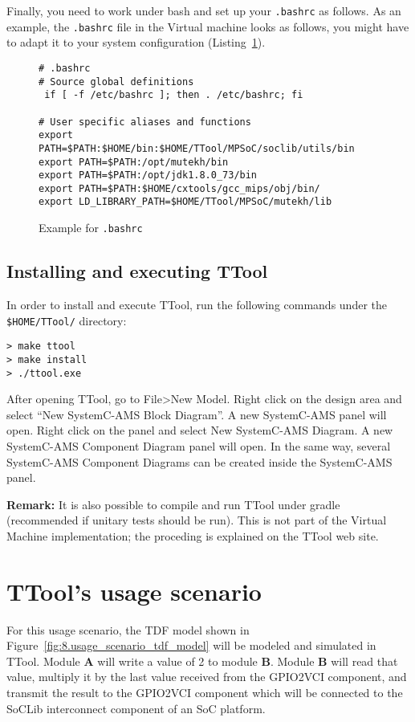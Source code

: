 Finally, you need to work under bash and set up your \texttt{.bashrc} as follows.
As an example, the \texttt{.bashrc} file in the Virtual machine looks as follows, you might have to adapt it to your system configuration (Listing~\ref{code:bashrc}).
\begin{figure}[tb]
\begin{verbatim}
# .bashrc
# Source global definitions
 if [ -f /etc/bashrc ]; then . /etc/bashrc; fi

# User specific aliases and functions
export PATH=$PATH:$HOME/bin:$HOME/TTool/MPSoC/soclib/utils/bin
export PATH=$PATH:/opt/mutekh/bin
export PATH=$PATH:/opt/jdk1.8.0_73/bin
export PATH=$PATH:$HOME/cxtools/gcc_mips/obj/bin/
export LD_LIBRARY_PATH=$HOME/TTool/MPSoC/mutekh/lib
\end{verbatim}
  \caption{Example for \texttt{.bashrc}}
  \label{code:bashrc}
\end{figure}

\newpage
\subsection{Installing and executing TTool}
In order to install and execute TTool, run the following commands under the \texttt{\$HOME/TTool/} directory:

\begin{verbatim}
> make ttool
> make install
> ./ttool.exe
\end{verbatim}

After opening TTool, go to File>New Model. Right click on the design area and select ``New SystemC-AMS Block Diagram''. A new SystemC-AMS panel will open. Right click on the panel and select New SystemC-AMS Diagram.
A new SystemC-AMS Component Diagram panel will open. In the same way, several SystemC-AMS Component Diagrams can be created inside the SystemC-AMS panel.

\textbf{Remark:} It is also possible to compile and run TTool under gradle (recommended if unitary tests should be run). This is not part of the Virtual Machine implementation; the proceding is explained on the TTool web site.

\section{TTool's usage scenario}
\label{sec:appendix-usage-scenario}

For this usage scenario, the TDF model shown in Figure~\ref{fig:8.usage_scenario_tdf_model} will be modeled and simulated in TTool. Module \textbf{A} will write a value of 2 to module \textbf{B}. Module \textbf{B} will read that value, multiply it by the last value received from the GPIO2VCI component, and transmit the result to the GPIO2VCI component which will be connected to the SoCLib interconnect component of an SoC platform. 


